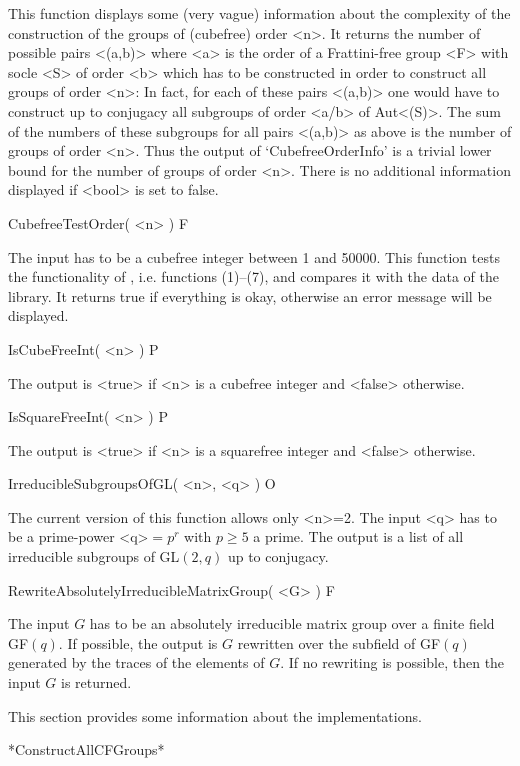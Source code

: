 This function displays some (very vague)
information about the complexity of the construction of the groups of
(cubefree) order <n>. It returns the number of possible pairs <(a,b)> where
<a> is the order of a Frattini-free group <F> with socle <S> of order <b> which
has to be constructed in order to construct all groups of order <n>: In fact,
for each of these pairs <(a,b)> one would have to construct up to conjugacy all
subgroups of order <a/b> of Aut<(S)>. The sum of the numbers of these
subgroups for all pairs  <(a,b)> as above is the number of groups of order
<n>. Thus the output of `CubefreeOrderInfo' is a trivial lower bound for the number of
groups of order <n>. There is no additional information
displayed if <bool> is set to false.

\>CubefreeTestOrder( <n> ) F

The input has to be a cubefree integer between 1 and 50000. This function
tests the functionality of {\Cubefree}, i.e. functions (1)--(7), and compares it with the data
of the {\SmallGroups} library. It returns true if everything is okay,
otherwise an error message will be displayed.

\>IsCubeFreeInt( <n> ) P

The output is <true> if <n> is a cubefree integer and <false> otherwise.


\>IsSquareFreeInt( <n> ) P

The output is <true> if <n> is a squarefree integer and <false> otherwise.

\>IrreducibleSubgroupsOfGL( <n>, <q> ) O

The current version of this function allows only <n>=2. The input <q> has to be a prime-power <q>$=p^r$ with $p\geq 5$ a prime. The output
is a list of all irreducible subgroups of GL$(2,q)$ up to conjugacy.

\>RewriteAbsolutelyIrreducibleMatrixGroup( <G> ) F

The input $G$ has to be an absolutely irreducible matrix group over a finite
field GF$(q)$. If possible, the output is
$G$ rewritten over the subfield of GF$(q)$ generated by the traces of the
elements of $G$. If no rewriting is possible, then the
input $G$ is returned. 



This section provides some information about the implementations.


*ConstructAllCFGroups*

